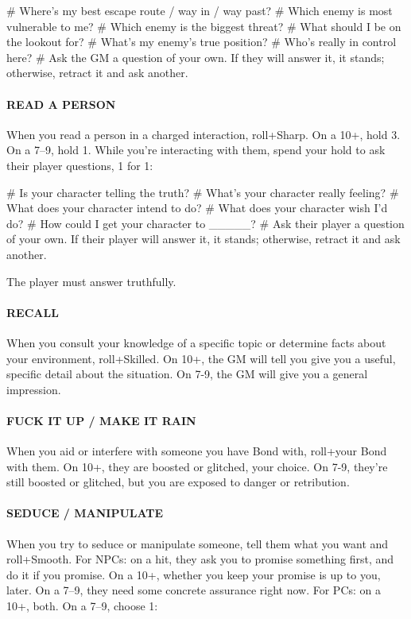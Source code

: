 \begin{easylist}
    # Where’s my best escape route / way in / way past?
    # Which enemy is most vulnerable to me?
    # Which enemy is the biggest threat?
    # What should I be on the lookout for?
    # What’s my enemy’s true position?
    # Who’s really in control here?
    # Ask the GM a question of your own. If they will answer it, it stands; otherwise, retract it and ask another.
\end{easylist}


\paragraph{READ A PERSON}
When you read a person in a charged interaction, roll+Sharp. On a 10+, hold 3. On a 7–9, hold 1. While you’re interacting with them, spend your hold to ask their player questions, 1 for 1:

\begin{easylist}
    # Is your character telling the truth?
    # What’s your character really feeling?
    # What does your character intend to do?
    # What does your character wish I’d do?
    # How could I get your character to \_\_\_\_\_?
    # Ask their player a question of your own. If their player will answer it, it stands; otherwise, retract it and ask another.
\end{easylist}

The player must answer truthfully.


\paragraph{RECALL}
When you consult your knowledge of a specific topic or determine facts about your environment, roll+Skilled. On 10+, the GM will tell you give you a useful, specific detail about the situation. On 7-9, the GM will give you a general impression.

\paragraph{FUCK IT UP / MAKE IT RAIN}
When you aid or interfere with someone you have Bond with, roll+your Bond with them. On 10+, they are boosted or glitched, your choice. On 7-9, they’re still boosted or glitched, but you are exposed to danger or retribution.

\paragraph{SEDUCE / MANIPULATE}
When you try to seduce or manipulate someone, tell them what you want and roll+Smooth.
For NPCs: on a hit, they ask you to promise something first, and do it if you promise. On a 10+, whether you keep your promise is up to you, later. On a 7–9, they need some concrete assurance right now.
For PCs: on a 10+, both. On a 7–9, choose 1:


